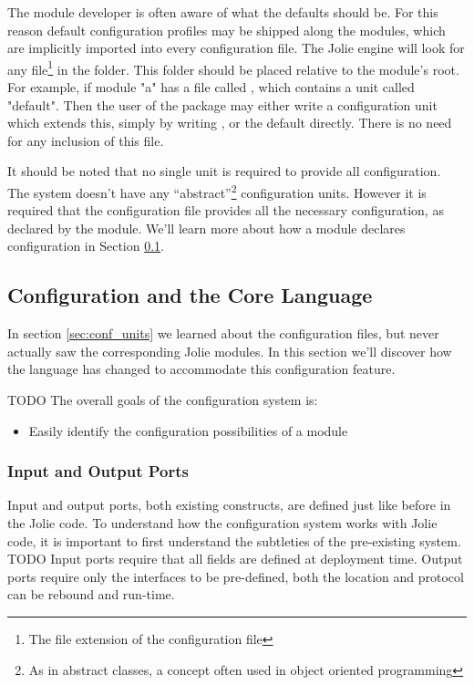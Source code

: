 The module developer is often aware of what the defaults should be. For this
reason default configuration profiles may be shipped along the modules, which
are implicitly imported into every configuration file. The Jolie engine will
look for any  file\footnote{The file extension of the
configuration file} in the  folder. This folder
should be placed relative to the module's root. For example, if module "a" has
a file called , which contains a unit
called "default". Then the user of the package may either write a configuration
unit which extends this, simply by writing , or the default
directly. There is no need for any inclusion of this file.

It should be noted that no single unit is required to provide all
configuration. The system doesn't have any ``abstract''\footnote{As in abstract
classes, a concept often used in object oriented programming} configuration
units. However it is required that the configuration file provides all the
necessary configuration, as declared by the module. We'll learn more about
how a module declares configuration in Section \ref{sec:ol_conf}.

\subsection{Configuration and the Core Language}
\label{sec:ol_conf}

In section \ref{sec:conf_units} we learned about the configuration files, but
never actually saw the corresponding Jolie modules. In this section we'll
discover how the language has changed to accommodate this configuration
feature.

TODO The overall goals of the configuration system is:

\begin{itemize}
\item Easily identify the configuration possibilities of a module
\end{itemize}

\subsubsection*{Input and Output Ports}

%

Input and output ports, both existing constructs, are defined just like before
in the Jolie code. To understand how the configuration system works with Jolie
code, it is important to first understand the subtleties of the pre-existing
system. TODO Input ports require that all fields are defined at deployment
time. Output ports require only the interfaces to be pre-defined, both the
location and protocol can be rebound and run-time.

